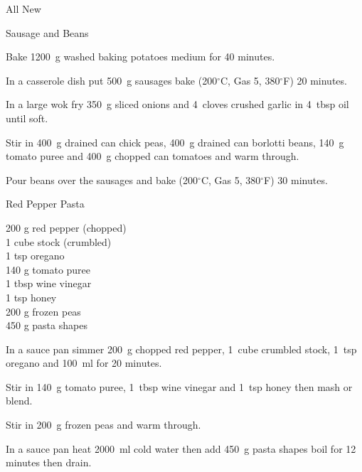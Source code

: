 \begin{menu}{All New}
\begin{recipe}{2}{Sausage and Beans}
\begin{ingredients}
		\end{ingredients}
	
    \begin{instructions}
    \item 
      Bake 1200~g washed baking potatoes
      medium for 40 minutes.
    \item 
        In a casserole dish put
        500~g  sausages
        bake 
      (200$^{\circ}$C, Gas 5, 380$^{\circ}$F)
     20 minutes.
      \item 
        In a large wok fry
        350~g sliced onions
        and
        4~cloves crushed garlic
        in
        4~tbsp  oil
        until soft.
      \item 
        Stir in
        400~g drained can chick peas,
        400~g drained can borlotti beans,
        140~g  tomato puree
        and
        400~g chopped can tomatoes
        and warm through.
      \item 
        Pour beans over the sausages and bake 
      (200$^{\circ}$C, Gas 5, 380$^{\circ}$F)
     30 minutes.
      
    \end{instructions}
    \end{recipe}%
  
    \begin{recipe}{2}{Red Pepper Pasta}%
    
		\begin{ingredients}
		200 g red pepper (chopped) \\
	1 cube stock (crumbled) \\
	1 tsp oregano  \\
	140 g tomato puree  \\
	1 tbsp wine vinegar  \\
	1 tsp honey  \\
	200 g frozen peas  \\
	450 g pasta shapes  \\
	
		\end{ingredients}
	
    \begin{instructions}
    \item 
        In a sauce pan simmer
        200~g chopped red pepper,
        1~cube crumbled stock,
        1~tsp  oregano
        and
        100~ml  
        for 20 minutes.
      \item 
        Stir in
        140~g  tomato puree,
        1~tbsp  wine vinegar
        and
        1~tsp  honey
        then mash or blend.
      \item 
        Stir in
        200~g  frozen peas
        and warm through.
      \item 
      In a sauce pan heat
      2000~ml  cold water then add
      450~g  pasta shapes
      boil for 12
      minutes then drain.
    

\end{instructions}
\end{recipe}
\end{menu}
